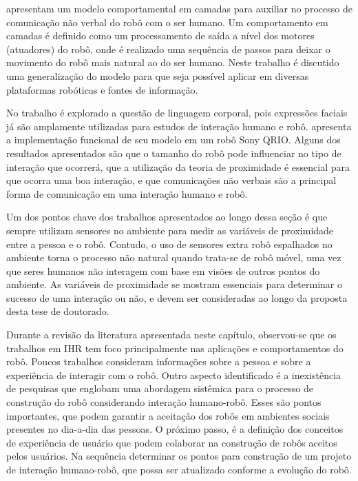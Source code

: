 \textcite{brooks:2007} apresentam um modelo comportamental em camadas para auxiliar no processo de comunicação não verbal do robô com o ser humano. Um comportamento em camadas é definido como um processamento de saída a nível dos motores (atuadores) do robô, onde é realizado uma sequência de passos para deixar o movimento do robô mais natural ao do ser humano. Neste trabalho é discutido uma generalização do modelo para que seja possível aplicar em diversas plataformas robóticas e fontes de informação.

No trabalho é explorado a questão de linguagem corporal, pois expressões faciais já são amplamente utilizadas para estudos de interação humano e robô. \textcite{brooks:2007} apresenta a implementação funcional de seu modelo em um robô Sony QRIO. Alguns dos resultados apresentados são que o tamanho do robô pode influenciar no tipo de interação que ocorrerá, que a utilização da teoria de proximidade é essencial para que ocorra uma boa interação, e que comunicações não verbais são a principal forma de comunicação em uma interação humano e robô.

Um dos pontos chave dos trabalhos apresentados ao longo dessa seção é que sempre utilizam sensores no ambiente para medir as variáveis de proximidade entre a pessoa e o robô. Contudo, o uso de sensores extra robô espalhados no ambiente torna o processo não natural quando trata-se de robô móvel, uma vez que seres humanos não interagem com base em visões de outros pontos do ambiente. As variáveis de proximidade se mostram essenciais para determinar o sucesso de uma interação ou não, e devem ser consideradas ao longo da proposta desta tese de doutorado.

Durante a revisão da literatura apresentada neste capítulo, observou-se que os trabalhos em IHR tem foco principalmente nas aplicações e comportamentos do robô. Poucos trabalhos consideram informações sobre a pessoa e sobre a experiência de interagir com o robô. Outro aspecto identificado é a inexistência de pesquisas que englobam uma abordagem sistêmica para o processo de construção do robô considerando interação humano-robô. Esses são pontos importantes, que podem garantir a aceitação dos robôs em ambientes sociais presentes no dia-a-dia das pessoas. O próximo passo, é a definição dos conceitos de experiência de usuário que podem colaborar na construção de robôs aceitos pelos usuários. Na sequência determinar os pontos para construção de um projeto de interação humano-robô, que possa ser atualizado conforme a evolução do robô.
